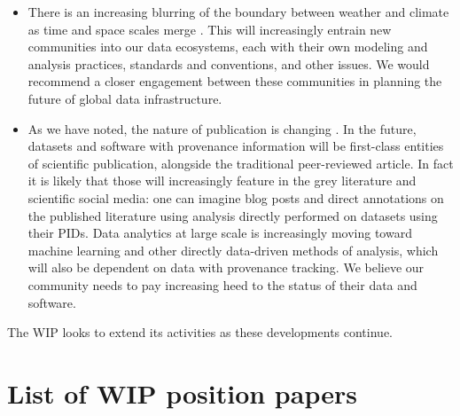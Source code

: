 \documentclass[gmd,manuscript]{copernicus}
\newcommand{\pipref}[1] {\citep{ref:#1}}
\begin{document}
\begin{itemize}
\item There is an increasing blurring of the boundary between weather
  and climate as time and space scales merge \pipref{hoskins2013}.
  This will increasingly entrain new communities into our data
  ecosystems, each with their own modeling and analysis practices,
  standards and conventions, and other issues. We would recommend a
  closer engagement between these communities in planning the future
  of global data infrastructure.
\item As we have noted, the nature of publication is changing
  \citep[see e.g][]{ref:davidetal2016}. In the future, datasets and
  software with provenance information will be first-class entities of
  scientific publication, alongside the traditional peer-reviewed
  article. In fact it is likely that those will increasingly feature
  in the grey literature and scientific social media: one can imagine
  blog posts and direct annotations on the published literature using
  analysis directly performed on datasets using their PIDs. Data
  analytics at large scale is increasingly moving toward machine
  learning and other directly data-driven methods of analysis, which
  will also be dependent on data with provenance tracking. We believe our
  community needs to pay increasing heed to the status of their data
  and software.
\end{itemize}

The WIP looks to extend its activities as these developments continue.

\appendix

\section{List of WIP position papers}
\label{sec:wip}
\end{document}
